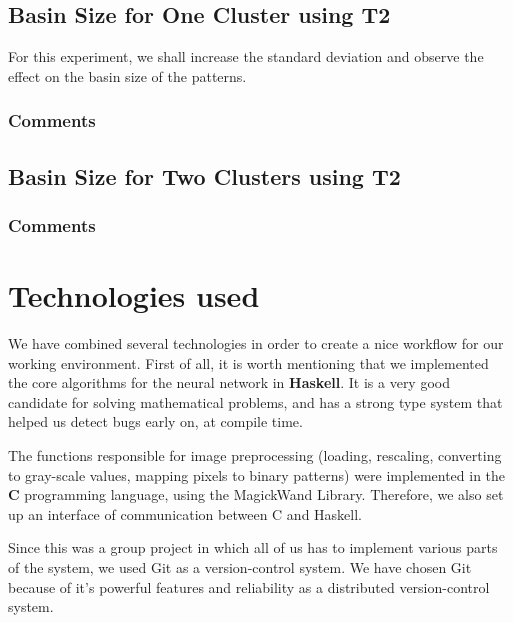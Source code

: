 \subsection{Basin Size for One Cluster using T2}

For this experiment, we shall increase the standard deviation and observe the effect on the basin size of the patterns.


\subsubsection{Comments}

\subsection{Basin Size for Two Clusters using T2}

\subsubsection{Comments}

\section{Technologies used}

We have combined several technologies in order to create a nice workflow for our working environment. First of all, it is worth mentioning that we implemented the core algorithms for the neural network in \textbf{Haskell}. It is a very good candidate for solving mathematical problems, and has a strong type system that helped us detect bugs early on, at compile time.

The functions responsible for image preprocessing (loading, rescaling, converting to gray-scale values, mapping pixels to binary patterns) were implemented in the \textbf{C} programming language, using the MagickWand Library. Therefore, we also set up an interface of communication between C and Haskell.

Since this was a group project in which all of us has to implement various parts of the system, we used Git as a version-control system. We have chosen Git because of it's powerful features and reliability as a distributed version-control system.


